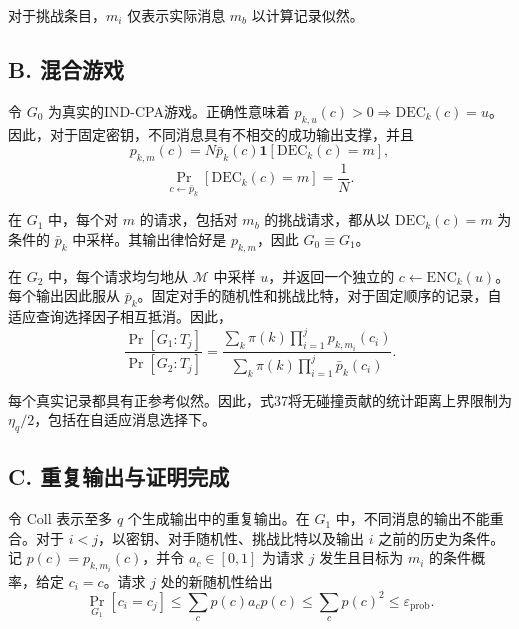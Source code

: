 \documentclass[UTF8,a4paper,zihao=-4,fontset=windows,openany]{ctexbook}
\begin{document}
对于挑战条目，\(m_i\) 仅表示实际消息 \(m_b\) 以计算记录似然。

\subsection*{B. 混合游戏}

令 \(G_0\) 为真实的IND-CPA游戏。正确性意味着 \(p_{k,u}(c) > 0 \Rightarrow \mathrm{DEC}_k(c) = u\)。因此，对于固定密钥，不同消息具有不相交的成功输出支撑，并且
\begin{equation}
p_{k,m}(c) = N \bar{p}_k(c) \mathbf{1}[\mathrm{DEC}_k(c) = m],
\end{equation}
\begin{equation}
\Pr_{c \leftarrow \bar{p}_k} [\mathrm{DEC}_k(c) = m] = \frac{1}{N}. \tag{38}
\end{equation}

在 \(G_1\) 中，每个对 \(m\) 的请求，包括对 \(m_b\) 的挑战请求，都从以 \(\mathrm{DEC}_k(c) = m\) 为条件的 \(\bar{p}_k\) 中采样。其输出律恰好是 \(p_{k,m}\)，因此 \(G_0 \equiv G_1\)。

在 \(G_2\) 中，每个请求均匀地从 \(\mathcal{M}\) 中采样 \(u\)，并返回一个独立的 \(c \leftarrow \mathrm{ENC}_k(u)\)。每个输出因此服从 \(\bar{p}_k\)。固定对手的随机性和挑战比特，对于固定顺序的记录，自适应查询选择因子相互抵消。因此，
\begin{equation}
\frac{\Pr[G_1 : T_j]}{\Pr[G_2 : T_j]} = \frac{\sum_k \pi(k) \prod_{i=1}^j p_{k,m_i}(c_i)}{\sum_k \pi(k) \prod_{i=1}^j \bar{p}_k(c_i)}. \tag{39}
\end{equation}

每个真实记录都具有正参考似然。因此，式37将无碰撞贡献的统计距离上界限制为 \(\eta_q/2\)，包括在自适应消息选择下。

\subsection*{C. 重复输出与证明完成}

令 \(\mathrm{Coll}\) 表示至多 \(q\) 个生成输出中的重复输出。在 \(G_1\) 中，不同消息的输出不能重合。对于 \(i < j\)，以密钥、对手随机性、挑战比特以及输出 \(i\) 之前的历史为条件。记 \(p(c) = p_{k,m_i}(c)\)，并令 \(a_c \in [0,1]\) 为请求 \(j\) 发生且目标为 \(m_i\) 的条件概率，给定 \(c_i = c\)。请求 \(j\) 处的新随机性给出
\begin{equation}
\Pr_{G_1}[c_i = c_j] \le \sum_c p(c) a_c p(c) \le \sum_c p(c)^2 \le \varepsilon_{\mathrm{prob}}. \tag{40}
\end{equation}
\end{document}
